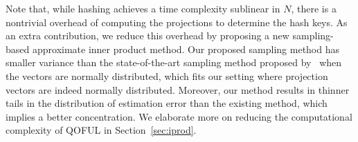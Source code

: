 Note that, while hashing achieves a time complexity sublinear in $N$, there is a nontrivial overhead of computing the projections to determine the hash keys.
As an extra contribution, we reduce this overhead by proposing a new sampling-based approximate inner product method.
Our proposed sampling method has smaller variance than the state-of-the-art sampling method proposed by~\cite{jain10hashing,kannan09spectral} when the vectors are normally distributed, which fits our setting where projection vectors are indeed normally distributed. 
Moreover, our method results in thinner tails in the distribution of estimation error than the existing method, which implies a better concentration.
We elaborate more on reducing the computational complexity of QOFUL in Section~\ref{sec:iprod}.


